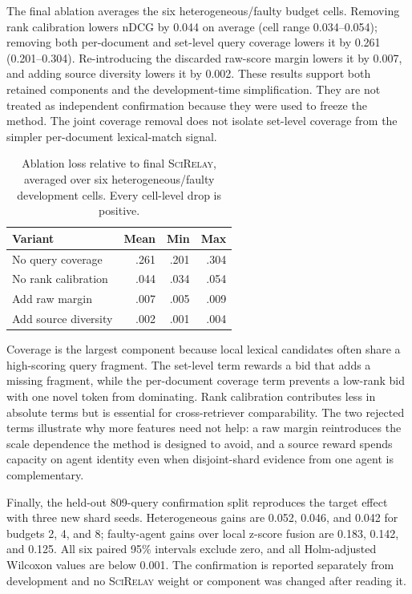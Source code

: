 \documentclass[sigconf]{acmart}
\newcommand{\method}{\textsc{SciRelay}}
\newcommand{\ndcg}{nDCG}
\begin{document}
The final ablation averages the six heterogeneous/faulty budget cells. Removing rank calibration lowers \ndcg{} by 0.044 on average (cell range 0.034--0.054); removing both per-document and set-level query coverage lowers it by 0.261 (0.201--0.304). Re-introducing the discarded raw-score margin lowers it by 0.007, and adding source diversity lowers it by 0.002. These results support both retained components and the development-time simplification. They are not treated as independent confirmation because they were used to freeze the method. The joint coverage removal does not isolate set-level coverage from the simpler per-document lexical-match signal.

\begin{table}[t]
\caption{Ablation loss relative to final \method{}, averaged over six heterogeneous/faulty development cells. Every cell-level drop is positive.}
\label{tab:ablation}
\small
\setlength{\tabcolsep}{4pt}
\begin{tabular}{lrrr}
\toprule
Variant & Mean & Min & Max \\
\midrule
No query coverage & .261 & .201 & .304 \\
No rank calibration & .044 & .034 & .054 \\
Add raw margin & .007 & .005 & .009 \\
Add source diversity & .002 & .001 & .004 \\
\bottomrule
\end{tabular}
\end{table}

Coverage is the largest component because local lexical candidates often share a high-scoring query fragment. The set-level term rewards a bid that adds a missing fragment, while the per-document coverage term prevents a low-rank bid with one novel token from dominating. Rank calibration contributes less in absolute terms but is essential for cross-retriever comparability. The two rejected terms illustrate why more features need not help: a raw margin reintroduces the scale dependence the method is designed to avoid, and a source reward spends capacity on agent identity even when disjoint-shard evidence from one agent is complementary.

Finally, the held-out 809-query confirmation split reproduces the target effect with three new shard seeds. Heterogeneous gains are 0.052, 0.046, and 0.042 for budgets 2, 4, and 8; faulty-agent gains over local z-score fusion are 0.183, 0.142, and 0.125. All six paired 95\% intervals exclude zero, and all Holm-adjusted Wilcoxon values are below 0.001. The confirmation is reported separately from development and no \method{} weight or component was changed after reading it.
\end{document}
